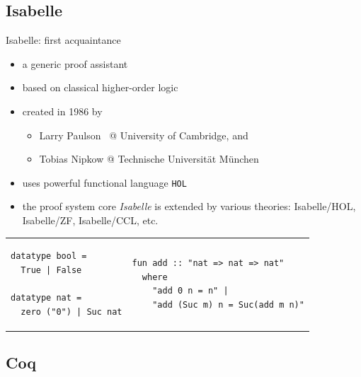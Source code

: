 \documentclass[aspectratio=169, fleqn]{beamer}
\begin{document}
\subsection{Isabelle}

\begin{frame}[fragile]{Isabelle: first acquaintance}


\vspace{10pt}
\begin{itemize}
  \item a generic proof assistant
  \item based on classical higher-order logic
  \item created in 1986 by
    \begin{itemize}
    \item Larry Paulson \ @ University of Cambridge, and
    \item Tobias Nipkow @ Technische Universit\"{a}t M\"{u}nchen
    \end{itemize}
  \item \textcolor{dkgray}{ uses powerful functional language \texttt{HOL} }
  \item \textcolor{dkgray}{ the proof system core \textit{Isabelle} is extended by various theories: Isabelle/HOL, Isabelle/ZF, Isabelle/CCL, etc. }
\end{itemize}

\begin{tabular}{p{.45\linewidth} p{.45\linewidth}}
\begin{lstlisting}[language=isabelle, caption={Definition of basic datatypes 
%in Isabelle:
}]
datatype bool = 
  True | False
  
datatype nat = 
  zero ("0") | Suc nat
\end{lstlisting}
&
\begin{lstlisting}[language=isabelle,caption={Definition of addition over \texttt{nat} }]
fun add :: "nat => nat => nat"
  where
    "add 0 n = n" |
    "add (Suc m) n = Suc(add m n)"
\end{lstlisting}
\end{tabular}

\end{frame}



\subsection{Coq}
\end{document}
